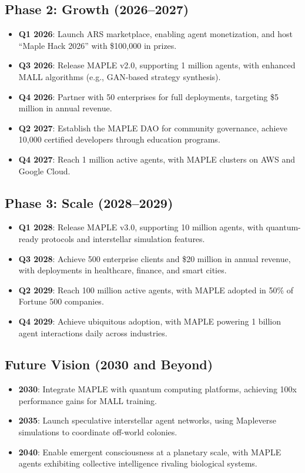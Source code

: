 \documentclass[a4paper,11pt]{article}
\begin{document}
\subsection{Phase 2: Growth (2026–2027)}
\begin{itemize}[leftmargin=*]
    \item \textbf{Q1 2026}: Launch ARS marketplace, enabling agent monetization, and host “Maple Hack 2026” with \$100,000 in prizes.
    \item \textbf{Q3 2026}: Release MAPLE v2.0, supporting 1 million agents, with enhanced MALL algorithms (e.g., GAN-based strategy synthesis).
    \item \textbf{Q4 2026}: Partner with 50 enterprises for full deployments, targeting \$5 million in annual revenue.
    \item \textbf{Q2 2027}: Establish the MAPLE DAO for community governance, achieve 10,000 certified developers through education programs.
    \item \textbf{Q4 2027}: Reach 1 million active agents, with MAPLE clusters on AWS and Google Cloud.
\end{itemize}

\subsection{Phase 3: Scale (2028–2029)}
\begin{itemize}[leftmargin=*]
    \item \textbf{Q1 2028}: Release MAPLE v3.0, supporting 10 million agents, with quantum-ready protocols and interstellar simulation features.
    \item \textbf{Q3 2028}: Achieve 500 enterprise clients and \$20 million in annual revenue, with deployments in healthcare, finance, and smart cities.
    \item \textbf{Q2 2029}: Reach 100 million active agents, with MAPLE adopted in 50\% of Fortune 500 companies.
    \item \textbf{Q4 2029}: Achieve ubiquitous adoption, with MAPLE powering 1 billion agent interactions daily across industries.
\end{itemize}

\subsection{Future Vision (2030 and Beyond)}
\begin{itemize}[leftmargin=*]
    \item \textbf{2030}: Integrate MAPLE with quantum computing platforms, achieving 100x performance gains for MALL training.
    \item \textbf{2035}: Launch speculative interstellar agent networks, using Mapleverse simulations to coordinate off-world colonies.
    \item \textbf{2040}: Enable emergent consciousness at a planetary scale, with MAPLE agents exhibiting collective intelligence rivaling biological systems.
\end{itemize}
\end{document}
